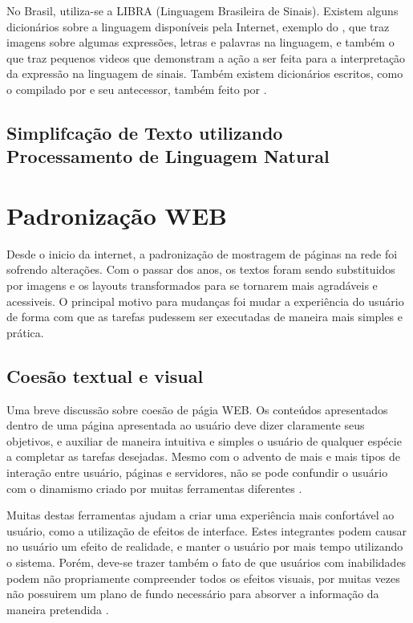 \documentclass[
	12pt,				%
	oneside,			%
	a4paper,			%
	english,			%
	brazil				%
	]{abntex2ppgsi}
\begin{document}
No Brasil, utiliza-se a LIBRA (Linguagem Brasileira de Sinais). Existem alguns dicionários sobre a linguagem disponíveis pela Internet, exemplo do , que traz imagens sobre algumas expressões, letras e palavras na linguagem, e também o  que traz pequenos videos que demonstram a ação a ser feita para a interpretação da expressão na linguagem de sinais. Também existem dicionários escritos, como o compilado por  e seu antecessor, também feito por .

\section{Simplifcação de Texto utilizando Processamento de Linguagem Natural} \label{nlp}


\chapter{Padronização WEB}

Desde o inicio da internet, a padronização de mostragem de páginas na rede foi sofrendo alterações. Com o passar dos anos, os textos foram sendo substituidos por imagens e os layouts transformados para se tornarem mais agradáveis e acessiveis. O principal motivo para mudanças foi mudar a experiência do usuário de forma com que as tarefas pudessem ser executadas de maneira mais simples e prática. 

 
\section{Coesão textual e visual}

Uma breve discussão sobre coesão de págia WEB. Os conteúdos apresentados dentro de uma página apresentada ao usuário deve dizer claramente seus objetivos, e auxiliar de maneira intuitiva e simples o usuário de qualquer espécie a completar as tarefas desejadas. Mesmo com o advento de mais e mais tipos de interação entre usuário, páginas e servidores, não se pode confundir o usuário com o dinamismo criado por muitas ferramentas diferentes \cite{webAcessibility}. 

Muitas destas ferramentas ajudam a criar uma experiência mais confortável ao usuário, como a utilização de efeitos de interface. Estes integrantes podem causar no usuário um efeito de realidade, e manter o usuário por mais tempo utilizando o sistema. Porém, deve-se trazer também o fato de que usuários com inabilidades podem não propriamente compreender todos os efeitos visuais, por muitas vezes não possuirem um plano de fundo necessário para absorver a informação da maneira pretendida \cite{deafPeople}.
\end{document}
